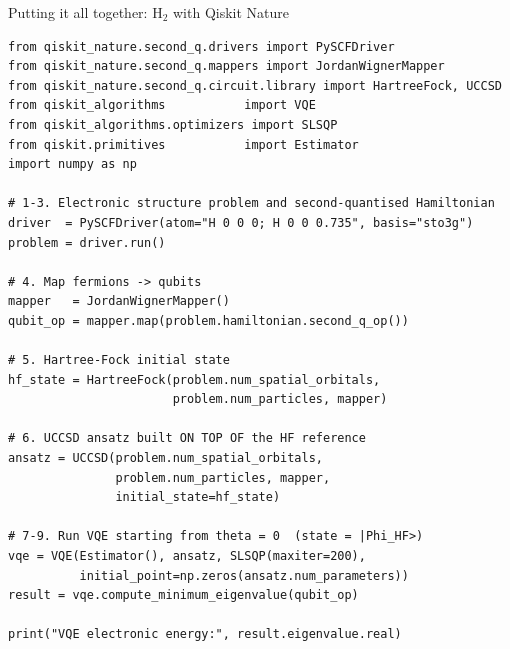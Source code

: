 \documentclass[10pt,aspectratio=169]{beamer}
\begin{document}
\begin{frame}[fragile]{Putting it all together: H$_2$ with Qiskit Nature}
\begin{lstlisting}
from qiskit_nature.second_q.drivers import PySCFDriver
from qiskit_nature.second_q.mappers import JordanWignerMapper
from qiskit_nature.second_q.circuit.library import HartreeFock, UCCSD
from qiskit_algorithms           import VQE
from qiskit_algorithms.optimizers import SLSQP
from qiskit.primitives           import Estimator
import numpy as np

# 1-3. Electronic structure problem and second-quantised Hamiltonian
driver  = PySCFDriver(atom="H 0 0 0; H 0 0 0.735", basis="sto3g")
problem = driver.run()

# 4. Map fermions -> qubits
mapper   = JordanWignerMapper()
qubit_op = mapper.map(problem.hamiltonian.second_q_op())

# 5. Hartree-Fock initial state
hf_state = HartreeFock(problem.num_spatial_orbitals,
                       problem.num_particles, mapper)

# 6. UCCSD ansatz built ON TOP OF the HF reference
ansatz = UCCSD(problem.num_spatial_orbitals,
               problem.num_particles, mapper,
               initial_state=hf_state)

# 7-9. Run VQE starting from theta = 0  (state = |Phi_HF>)
vqe = VQE(Estimator(), ansatz, SLSQP(maxiter=200),
          initial_point=np.zeros(ansatz.num_parameters))
result = vqe.compute_minimum_eigenvalue(qubit_op)

print("VQE electronic energy:", result.eigenvalue.real)
\end{lstlisting}
\end{frame}
\end{document}
